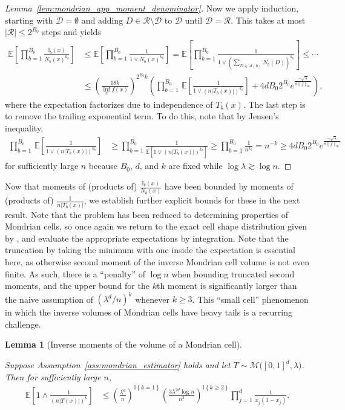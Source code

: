\documentclass[11pt,lof]{puthesis}
\newcommand{\E}{\ensuremath{\mathbb{E}}}
\newcommand{\I}{\ensuremath{\mathbb{I}}}
\newcommand{\cR}{\ensuremath{\mathcal{R}}}
\newcommand{\cA}{\ensuremath{\mathcal{A}}}
\newcommand{\cM}{\ensuremath{\mathcal{M}}}
\newcommand{\cD}{\ensuremath{\mathcal{D}}}
\theoremstyle{break}
\newtheorem{lemma}{Lemma}[section]
\theoremstyle{proof}
\newtheorem{proof}{Proof}
\begin{document}
\begin{proof}[Lemma~\ref{lem:mondrian_app_moment_denominator}]
%
Now we apply induction,
starting with $\cD = \emptyset$ and
adding $D \in \cR \setminus \cD$ to $\cD$ until
$\cD = \cR$.
This takes at most $|\cR| \leq 2^{B_0}$ steps and yields
%
\begin{align*}
\E\left[
\prod_{b=1}^{B_0}
\frac{\I_b(x)}{N_b(x)^{k_b}}
\right]
&\leq
\E\left[
\prod_{b=1}^{B_0}
\frac{1}{1 \vee N_b(x)^{k_b}}
\right]
=
\E\left[
\prod_{b=1}^{B_0}
\frac{1}{1 \vee \left( \sum_{D \in \cA(b)} N_b(D) \right)^{k_b}}
\right]
\leq \cdots \\
&\leq
\left( \frac{18k}{\inf_x f(x)} \right)^{2^{B_0} k}
\left(
\prod_{b=1}^{B_0}
\,\E \left[
\frac{1}{1 \vee (n |T_b(x)|)^{k_b}}
\right]
+ 4 d B_0 2^{B_0} e^{\frac{-\sqrt \lambda}{8 \|f\|_\infty}}
\right),
\end{align*}
%
where the expectation factorizes due to independence of $T_b(x)$.
The last step is to remove the trailing exponential term.
To do this, note that by Jensen's inequality,
%
\begin{align*}
\prod_{b=1}^{B_0}
\,\E \left[
\frac{1}{1 \vee (n |T_b(x)|)^{k_b}}
\right]
&\geq
\prod_{b=1}^{B_0}
\frac{1}
{\E \left[ 1 \vee (n |T_b(x)|)^{k_b} \right]}
\geq
\prod_{b=1}^{B_0}
\frac{1}{n^{k_b}}
= n^{-k}
\geq
4 d B_0 2^{B_0} e^{\frac{-\sqrt \lambda}{8 \|f\|_\infty}}
\end{align*}
%
for sufficiently large $n$
because $B_0$, $d$, and $k$ are fixed while
$\log \lambda \gtrsim \log n$.
\end{proof}

Now that moments of (products of) $\frac{\I_b(x)}{N_b(x)}$
have been bounded by moments of
(products of) $\frac{1}{n |T_b(x)|}$, we establish further
explicit bounds for these in the next result.
Note that the problem has been reduced to determining
properties of Mondrian cells, so once again we return to the
exact cell shape distribution given by \citet{mourtada2020minimax},
and evaluate the appropriate expectations by integration.
Note that the truncation by taking the minimum with one inside the expectation
is essential here, as otherwise second moment of the inverse Mondrian cell
volume is not even finite. As such, there is a ``penalty'' of $\log n$
when bounding truncated second moments,
and the upper bound for the $k$th moment is significantly
larger than the naive assumption of $(\lambda^d / n)^k$
whenever $k \geq 3$.
This ``small cell'' phenomenon in which the inverse volumes of Mondrian cells
have heavy tails is a recurring challenge.

\begin{lemma}[Inverse moments of the volume of a Mondrian cell]%
\label{lem:mondrian_app_moment_cell}

Suppose Assumption~\ref{ass:mondrian_estimator} holds
and let $T \sim \cM\big([0,1]^d, \lambda\big)$.
Then for sufficiently large $n$,
%
\begin{align*}
\E\left[
1 \wedge
\frac{1}{(n |T(x)|)^k}
\right]
&\leq
\left(
\frac{\lambda^d}{n}
\right)^{\I \left\{ k = 1 \right\}}
\left(
\frac{3 \lambda^{2d} \log n}{n^2}
\right)^{\I \left\{ k \geq 2 \right\}}
\prod_{j=1}^{d} \frac{1}{x_j (1-x_j)}.
\end{align*}
%
\end{lemma}
\end{document}

